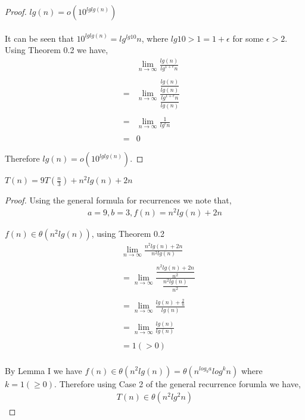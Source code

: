 \documentclass[12pt]{article}
\newenvironment{lemma}[2][Lemma]{\begin{trivlist}
\item[\hskip \labelsep {\bfseries #1}\hskip \labelsep {\bfseries #2.}]}{\end{trivlist}}
\newenvironment{question}[2][Question]{\begin{trivlist}
\item[\hskip \labelsep {\bfseries #1}\hskip \labelsep {\bfseries #2.}]}{\end{trivlist}}
\begin{document}
\begin{question}{4}
  \begin{proof} $lg(n) = o(10^{lglg(n)})$
    \leavevmode \\ \\
    It can be seen that $10^{lglg(n)} = lg^{lg10}n$, where $lg10 > 1 = 1 + \epsilon$ for some $\epsilon > 2$.
    Using Theorem 0.2 we have,
    \begin{align*}
      &\lim_{n\to\infty} \frac{
        lg(n)
      }{
        lg^{1 + \epsilon}n
      }&\\ \\
      = & \lim_{n\to\infty} \frac{
        \dfrac{lg(n)}{lg(n)}
      }{
        \dfrac{lg^{1 + \epsilon}n}{lg(n)}
      }&\\ \\
      = & \lim_{n\to\infty} \frac{
        1
      }{
        lg^{\epsilon}n
      }&\\ \\
      = & 0 &
    \end{align*}

    Therefore $lg(n) = o(10^{lglg(n)})$.
  \end{proof}
\end{question}

\begin{question}{5 (a)} $T(n) = 9T(\frac{n}{3}) + n^{2}lg(n) + 2n$
  \leavevmode \\
  \begin{proof}
  Using the general formula for recurrences we note that,
  \begin{align*}
    a = 9, b = 3, f(n) = n^{2}lg(n) + 2n
  \end{align*}

    \begin{lemma}{I} $f(n) \in \theta(n^{2}lg(n))$, using Theorem 0.2
      \begin{align*}
        &\lim_{n\to\infty} \frac{
        n^{2}lg(n) + 2n
      }{
        n^{2}lg(n)
      }\\ \\
      & = \lim_{n\to\infty} \frac{
        \dfrac{
          n^{2}lg(n) + 2n
        }{n^{2}}
      }{
        \dfrac{
          n^{2}lg(n)
        }{n^{2}}
      }\\ \\
      & = \lim_{n\to\infty} \frac{
        lg(n) + \frac{2}{n}
      }{
        lg(n)
      }\\ \\
      & = \lim_{n\to\infty} \frac{
        lg(n)
      }{
        lg(n)
      }\\ \\
      & = 1 (> 0)\\
      \end{align*}
    \end{lemma}

    By Lemma I we have $f(n) \in \theta(n^{2}lg(n)) = \theta(n^{log_{b}a}log^{k}n)$ where $k = 1 (\geq 0)$.
    Therefore using Case 2 of the general recurrence forumla we have,
    \begin{align*}
      T(n) \in \theta(n^{2}lg^{2}n)
    \end{align*}
  \end{proof}
\end{question}
\end{document}
